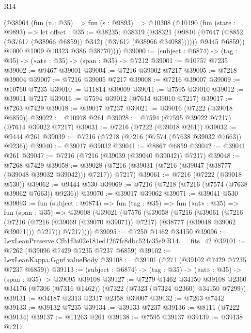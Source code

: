 \begin{lexlean}{R14}
\begin{coremodule}
          (@38964
            (fun (n : @35) =>
            fun (s : @9893) =>
            @10308
              (@10190
                (fun (state : @9893) =>
                let offset : @35 := @38235;
                @38319
                  (@38321
                    (@9810 (@7647 (@8852 (@37617 (@38966 @6859)) @342) (@37617 (@38966 @34088))))))
                @9445
                @6859))
            @1000
            @1009
            @10323
            @386
            @38770))))
@39000 := (subject : @6874) -> (tag : @35) -> («at» : @35) -> (span : @35) -> @7212
@39001 := @10757 @7235
@39002 := @9467 @39001
@39004 := @7216 @39002 @7217
@39005 := @7218 @39004
@39007 := @7216 @39005 @7217
@39008 := @7216 @39007
@39009 := @10760 @7235
@39010 := @11814 @39009
@39011 := @7595 @39010
@39012 := @39011 @7217
@39016 := @7594 @39012 (@7614 @39010 @7217)
@39017 := @7263 @7429
@39018 := @39017 @7237
@39021 := @39016 (@7222 (@39018 @6859))
@39022 := @10978 @261
@39028 := @7594 (@7595 @39022 @7217) (@7614 @39022 @7217)
@39031 := @7216 (@7222 (@39018 @261))
@39032 := @9444 @261
@39039 := @7216 (@7218 (@7216 (@7574 (@7638 @39032 @7663)) @9236))
@39040 := @39017 @39032
@39041 := @8867 @6859
@39042 := @39041 @261
@39047 := @7216 (@7216 (@39039 (@39040 @39042)) @7217)
@39048 := @7268 @7429
@39058 := @39028 (@7216 (@39031 (@7216 (@39047 (@38777 (@39048 @39032 @39042))) @7217)) @7217)
@39061 := @7216 (@7222 (@39018 @530))
@39062 := @9444 @530
@39069 := @7216 (@7218 (@7216 (@7574 (@7638 @39062 @7663)) @9236))
@39070 := @39017 @39062
@39071 := @39041 @530
@39093 := fun (subject : @6874) =>
  fun (tag : @35) =>
  fun («at» : @35) =>
  fun (span : @35) =>
  @39008
    (@39021
      (@7576
        (@39058
          (@7216
            (@39061
              (@7216
                (@7216 (@7216 (@39069 (@39070 @39071)) @7217) (@38777 (@39048 @39062 @39071)))
                @7217))
            @7217))))
@39095 := @7250 @1462 @34150
@39096 := LexLeanPreserve.Cfb1f0a02e181ed1267fc8dbc524c35e9.R14.__fits_42
@39101 := @7262 (@39096 @7429 @7235 @7237 @6859)
@39102 := LexLeanKappa.Gguf.valueBody
@39108 := @39101 (@271 (@39102 @7429 @7235 @7237 @6859))
@39113 := (subject : @6874) -> (tag : @35) -> («at» : @35) -> (span : @35) -> @39095 @39108
@39127 := @7279
    @1462
    @34150
    @39108
    @2360
    @34176
    (@7306 (@7316 @1462))
    (@7322 (@7323 (@7324 @2360) @34150 @7299))
@39131 := @34187 @2313 @2317 @2358 @39007
@39132 := @7263 @7442
@39133 := @39132 @7235
@39134 := @39133 @7237
@39136 := @8111 (@7222 @39134)
@39137 := @11263 @261
@39138 := @7595 @39137
@39139 := @39138 @7217

\end{coremodule}
\end{lexlean}
